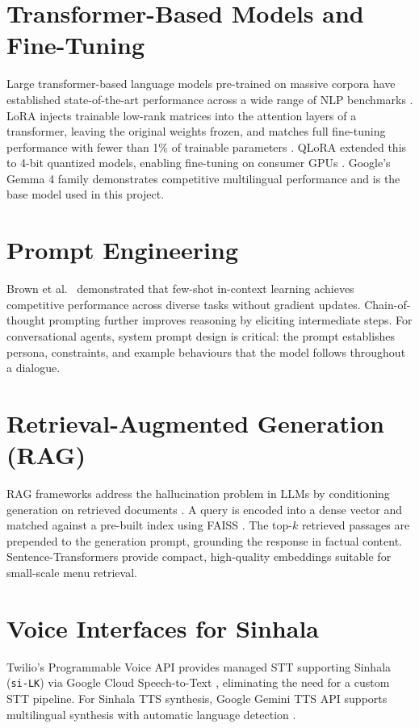 \documentclass[12pt,a4paper]{report}
\begin{document}
\section{Transformer-Based Models and Fine-Tuning}
Large transformer-based language models pre-trained on massive corpora have established state-of-the-art performance across a wide range of NLP benchmarks \cite{vaswani2017}. LoRA injects trainable low-rank matrices into the attention layers of a transformer, leaving the original weights frozen, and matches full fine-tuning performance with fewer than 1\% of trainable parameters \cite{hu2022}. QLoRA extended this to 4-bit quantized models, enabling fine-tuning on consumer GPUs \cite{dettmers2023}. Google's Gemma 4 family \cite{team2024} demonstrates competitive multilingual performance and is the base model used in this project.

\section{Prompt Engineering}
Brown et al.\ \cite{brown2020} demonstrated that few-shot in-context learning achieves competitive performance across diverse tasks without gradient updates. Chain-of-thought prompting \cite{wei2022} further improves reasoning by eliciting intermediate steps. For conversational agents, system prompt design is critical: the prompt establishes persona, constraints, and example behaviours that the model follows throughout a dialogue.

\section{Retrieval-Augmented Generation (RAG)}
RAG frameworks address the hallucination problem in LLMs by conditioning generation on retrieved documents \cite{lewis2020}. A query is encoded into a dense vector and matched against a pre-built index using FAISS \cite{johnson2021}. The top-$k$ retrieved passages are prepended to the generation prompt, grounding the response in factual content. Sentence-Transformers \cite{reimers2019} provide compact, high-quality embeddings suitable for small-scale menu retrieval.

\section{Voice Interfaces for Sinhala}
Twilio's Programmable Voice API provides managed STT supporting Sinhala (\texttt{si-LK}) via Google Cloud Speech-to-Text \cite{twilio2024}, eliminating the need for a custom STT pipeline. For Sinhala TTS synthesis, Google Gemini TTS API supports multilingual synthesis with automatic language detection \cite{google2024}.
\end{document}
